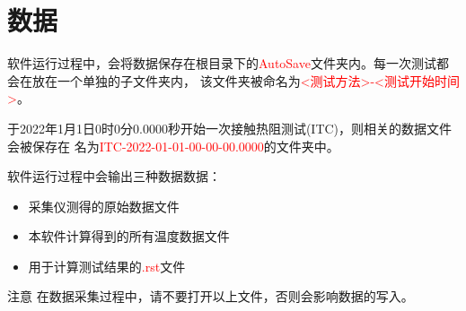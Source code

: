 \section{数据}

软件运行过程中，会将数据保存在根目录下的\textcolor{red}{AutoSave}文件夹内。每一次测试都会在放在一个单独的子文件夹内，
该文件夹被命名为\textcolor{red}{<测试方法>-<测试开始时间>}。
\begin{example}
    于2022年1月1日0时0分0.0000秒开始一次接触热阻测试(ITC)，则相关的数据文件会被保存在
    名为\textcolor{red}{ITC-2022-01-01-00-00-00.0000}的文件夹中。
\end{example}
软件运行过程中会输出三种数据数据：
\begin{itemize}
    \item 采集仪测得的原始数据文件
    \item 本软件计算得到的所有温度数据文件
    \item 用于计算测试结果的\textcolor{red}{.rst}文件
\end{itemize}
\begin{tips}{注意}
    在数据采集过程中，请不要打开以上文件，否则会影响数据的写入。
\end{tips}
